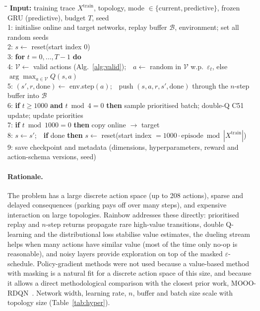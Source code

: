 \begin{algorithm}[htbp]
\caption{Training the proactive Rainbow DQN agent}
\label{alg:train}
\small
\begin{tabbing}
\hspace{1.2em}\=\hspace{1.2em}\=\hspace{1.2em}\=\kill
\textbf{Input:} training trace $X^{\text{train}}$, topology, mode $\in\{\text{current},\text{predictive}\}$, frozen GRU (predictive), budget $T$, seed\\
1:\> initialise online and target networks, replay buffer $\mathcal{B}$, environment; set all random seeds\\
2:\> $s\leftarrow$ reset(start index $0$)\\
3:\> \textbf{for} $t=0,\dots,T-1$ \textbf{do}\\
4:\>\> $\mathcal{V}\leftarrow$ valid actions (Alg.~\ref{alg:valid});\ \ $a\leftarrow$ random in $\mathcal{V}$ w.p.\ $\varepsilon_t$, else $\arg\max_{a\in\mathcal{V}}Q(s,a)$\\
5:\>\> $(s',r,\text{done})\leftarrow$ env.step$(a)$;\ \ push $(s,a,r,s',\text{done})$ through the $n$-step buffer into $\mathcal{B}$\\
6:\>\> \textbf{if} $t\ge1000$ \textbf{and} $t \bmod 4=0$ \textbf{then} sample prioritised batch; double-Q C51 update; update priorities\\
7:\>\> \textbf{if} $t \bmod 1000=0$ \textbf{then} copy online $\rightarrow$ target\\
8:\>\> $s\leftarrow s'$;\ \ \textbf{if} done \textbf{then} $s\leftarrow$ reset(start index $=1000\cdot\text{episode} \bmod |X^{\text{train}}|$)\\
9:\> save checkpoint and metadata (dimensions, hyperparameters, reward and action-schema versions, seed)
\end{tabbing}
\end{algorithm}

\paragraph{Rationale.} The problem has a large discrete action space (up to 208 actions), sparse and delayed consequences (parking pays off over many steps), and expensive interaction on large topologies. Rainbow addresses these directly: prioritised replay and $n$-step returns propagate rare high-value transitions, double Q-learning and the distributional loss stabilise value estimates, the dueling stream helps when many actions have similar value (most of the time only no-op is reasonable), and noisy layers provide exploration on top of the masked $\varepsilon$-schedule. Policy-gradient methods were not used because a value-based method with masking is a natural fit for a discrete action space of this size, and because it allows a direct methodological comparison with the closest prior work, MOOO-RDQN~\cite{chen2025mooo}. Network width, learning rate, $n$, buffer and batch size scale with topology size (Table~\ref{tab:hyper}).

